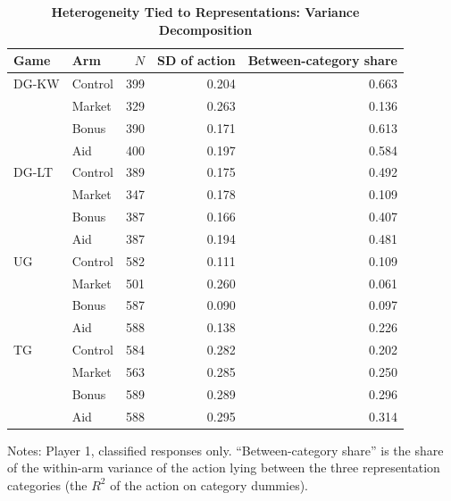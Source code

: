 \begin{table}[!htbp]
\centering
\small
\renewcommand{\arraystretch}{1.15}
\caption{\textbf{Heterogeneity Tied to Representations: Variance Decomposition}}
\label{tab:heterogeneity_decomposition}
\begin{tabular}{ll rrr}
\toprule
Game & Arm & $N$ & SD of action & Between-category share \\
\midrule
DG-KW & Control & 399 & 0.204 & 0.663 \\
 & Market & 329 & 0.263 & 0.136 \\
 & Bonus & 390 & 0.171 & 0.613 \\
 & Aid & 400 & 0.197 & 0.584 \\
DG-LT & Control & 389 & 0.175 & 0.492 \\
 & Market & 347 & 0.178 & 0.109 \\
 & Bonus & 387 & 0.166 & 0.407 \\
 & Aid & 387 & 0.194 & 0.481 \\
UG & Control & 582 & 0.111 & 0.109 \\
 & Market & 501 & 0.260 & 0.061 \\
 & Bonus & 587 & 0.090 & 0.097 \\
 & Aid & 588 & 0.138 & 0.226 \\
TG & Control & 584 & 0.282 & 0.202 \\
 & Market & 563 & 0.285 & 0.250 \\
 & Bonus & 589 & 0.289 & 0.296 \\
 & Aid & 588 & 0.295 & 0.314 \\
\bottomrule
\end{tabular}
\begin{flushleft}
\footnotesize Notes: Player 1, classified responses only. ``Between-category share'' is the share of the within-arm variance of the action lying between the three representation categories (the $R^2$ of the action on category dummies).
\end{flushleft}
\end{table}
